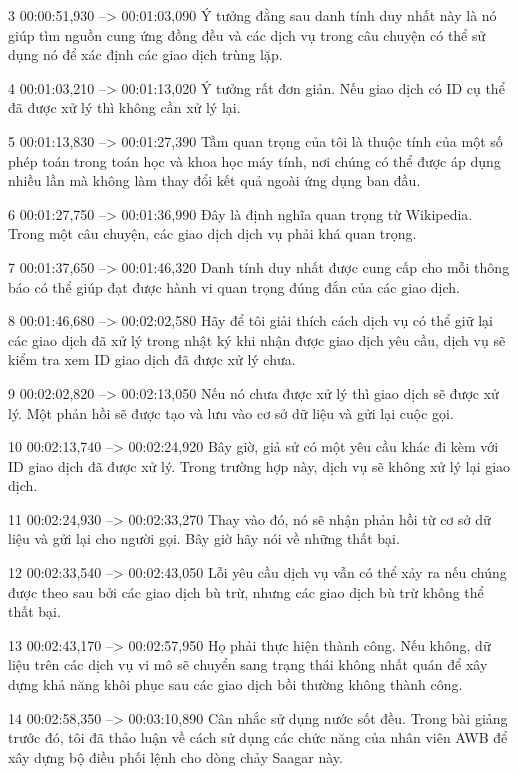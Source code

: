 3
00:00:51,930 --> 00:01:03,090
Ý tưởng đằng sau danh tính duy nhất này là nó giúp tìm nguồn cung ứng đồng đều và các dịch vụ trong câu chuyện có thể sử dụng nó để xác định các giao dịch trùng lặp.

4
00:01:03,210 --> 00:01:13,020
Ý tưởng rất đơn giản.  Nếu giao dịch có ID cụ thể đã được xử lý thì không cần xử lý lại.

5
00:01:13,830 --> 00:01:27,390
Tầm quan trọng của tôi là thuộc tính của một số phép toán trong toán học và khoa học máy tính, nơi chúng có thể được áp dụng nhiều lần mà không làm thay đổi kết quả ngoài ứng dụng ban đầu.

6
00:01:27,750 --> 00:01:36,990
Đây là định nghĩa quan trọng từ Wikipedia.  Trong một câu chuyện, các giao dịch dịch vụ phải khá quan trọng.

7
00:01:37,650 --> 00:01:46,320
Danh tính duy nhất được cung cấp cho mỗi thông báo có thể giúp đạt được hành vi quan trọng đúng đắn của các giao dịch.

8
00:01:46,680 --> 00:02:02,580
Hãy để tôi giải thích cách dịch vụ có thể giữ lại các giao dịch đã xử lý trong nhật ký khi nhận được giao dịch yêu cầu, dịch vụ sẽ kiểm tra xem ID giao dịch đã được xử lý chưa.

9
00:02:02,820 --> 00:02:13,050
Nếu nó chưa được xử lý thì giao dịch sẽ được xử lý.  Một phản hồi sẽ được tạo và lưu vào cơ sở dữ liệu và gửi lại cuộc gọi.

10
00:02:13,740 --> 00:02:24,920
Bây giờ, giả sử có một yêu cầu khác đi kèm với ID giao dịch đã được xử lý.  Trong trường hợp này, dịch vụ sẽ không xử lý lại giao dịch.

11
00:02:24,930 --> 00:02:33,270
Thay vào đó, nó sẽ nhận phản hồi từ cơ sở dữ liệu và gửi lại cho người gọi.  Bây giờ hãy nói về những thất bại.

12
00:02:33,540 --> 00:02:43,050
Lỗi yêu cầu dịch vụ vẫn có thể xảy ra nếu chúng được theo sau bởi các giao dịch bù trừ, nhưng các giao dịch bù trừ không thể thất bại.

13
00:02:43,170 --> 00:02:57,950
Họ phải thực hiện thành công.  Nếu không, dữ liệu trên các dịch vụ vi mô sẽ chuyển sang trạng thái không nhất quán để xây dựng khả năng khôi phục sau các giao dịch bồi thường không thành công.

14
00:02:58,350 --> 00:03:10,890
Cân nhắc sử dụng nước sốt đều.  Trong bài giảng trước đó, tôi đã thảo luận về cách sử dụng các chức năng của nhân viên AWB để xây dựng bộ điều phối lệnh cho dòng chảy Saagar này.

